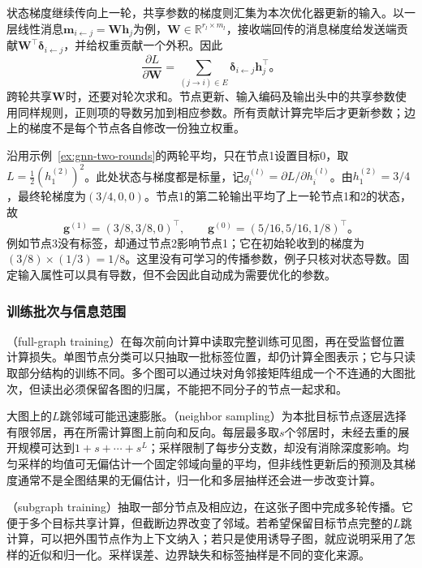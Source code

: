 状态梯度继续传向上一轮，共享参数的梯度则汇集为本次优化器更新的输入。以一层线性消息$\bm{m}_{i\leftarrow j}=\bm{W}\bm{h}_j$为例，$\bm{W}\in\mathbb{R}^{r_l\times m_l}$，接收端回传的消息梯度给发送端贡献$\bm{W}^{\top}\bm{\delta}_{i\leftarrow j}$，并给权重贡献一个外积。因此
\begin{equation}
  \frac{\partial L}{\partial\bm{W}}
    =\sum_{(j\to i)\in E}
      \bm{\delta}_{i\leftarrow j}\bm{h}_j^{\top}\text{。}
  \label{eq:gnn-shared-gradient}
\end{equation}
跨轮共享$\bm{W}$时，还要对轮次求和。节点更新、输入编码及输出头中的共享参数使用同样规则，正则项的导数另加到相应参数。所有贡献计算完毕后才更新参数；边上的梯度不是每个节点各自修改一份独立权重。

\begin{example}[无标签节点怎样得到梯度]
\label{ex:gnn-unlabeled-gradient}
沿用示例~\ref{ex:gnn-two-rounds}的两轮平均，只在节点1设置目标0，取$L=\tfrac12(h_1^{(2)})^2$。此处状态与梯度都是标量，记$g_i^{(l)}=\partial L/\partial h_i^{(l)}$。由$h_1^{(2)}=3/4$，最终轮梯度为$(3/4,0,0)$。节点1的第二轮输出平均了上一轮节点1和2的状态，故
\[
  \bm{g}^{(1)}=(3/8,3/8,0)^{\top},\qquad
  \bm{g}^{(0)}=(5/16,5/16,1/8)^{\top}\text{。}
\]
例如节点3没有标签，却通过节点2影响节点1；它在初始轮收到的梯度为$(3/8)\times(1/3)=1/8$。这里没有可学习的传播参数，例子只核对状态导数。固定输入属性可以具有导数，但不会因此自动成为需要优化的参数。
\end{example}

\subsubsection{训练批次与信息范围}
\label{sec:gnn-training-batches}

（full-graph training）在每次前向计算中读取完整训练可见图，再在受监督位置计算损失。单图节点分类可以只抽取一批标签位置，却仍计算全图表示；它与只读取部分结构的训练不同。多个图可以通过块对角邻接矩阵组成一个不连通的大图批次，但读出必须保留各图的归属，不能把不同分子的节点一起求和。

大图上的$L$跳邻域可能迅速膨胀。（neighbor sampling）为本批目标节点逐层选择有限邻居，再在所需计算图上前向和反向。每层最多取$s$个邻居时，未经去重的展开规模可达到$1+s+\cdots+s^L$；采样限制了每步分支数，却没有消除深度影响。均匀采样的均值可无偏估计一个固定邻域向量的平均，但非线性更新后的预测及其梯度通常不是全图结果的无偏估计，归一化和多层抽样还会进一步改变计算。

（subgraph training）抽取一部分节点及相应边，在这张子图中完成多轮传播。它便于多个目标共享计算，但截断边界改变了邻域。若希望保留目标节点完整的$L$跳计算，可以把外围节点作为上下文纳入；若只是使用诱导子图，就应说明采用了怎样的近似和归一化。采样误差、边界缺失和标签抽样是不同的变化来源。


